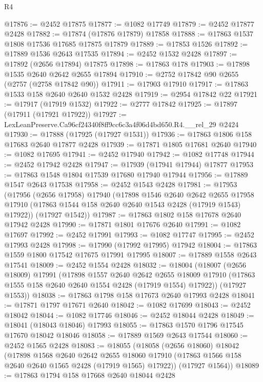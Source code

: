 \begin{lexlean}{R4}
\begin{coremodule}
@17876 := @2452 @17875
@17877 := @1082 @17749
@17879 := @2452 @17877 @2428
@17882 := @17874 (@17876 @17879) @17858
@17888 := @17863 @1537 @1808 @17536 @17685 @17875 @17879
@17889 := @17853 @1526
@17892 := @17889 @1536 @2643 @17535
@17894 := @2452 @1532 @2428
@17897 := @17892 (@2656 @17894) @17875
@17898 := @17863 @178
@17903 := @17898 @1535 @2640 @2642 @2655 @17894
@17910 := @2752 @17842 @90 @2655 (@2757 (@2758 @17842 @90))
@17911 := @17903 @17910
@17917 := @17863 @1533 @158 @2640 @2640 @1532 @2428
@17919 := @2954 @17842 @22
@17921 := @17917 (@17919 @1532)
@17922 := @2777 @17842
@17925 := @17897 (@17911 (@17921 @17922))
@17927 := LexLeanPreserve.Ca96cf24340f8ff9cc6c3a4f06d4bd650.R4.__rel_29 @2424
@17930 := @17888 (@17925 (@17927 @1531))
@17936 := @17863 @1806 @158 @17683 @2640 @17877 @2428
@17939 := @17871 @1805 @17681 @2640
@17940 := @1082 @17695
@17941 := @2452 @17940
@17942 := @1082 @17748
@17944 := @2452 @17942 @2428
@17947 := @17939 (@17941 @17944) @17877
@17953 := @17863 @1548 @1804 @17539 @17680 @17940 @17944
@17956 := @17889 @1547 @2643 @17538
@17958 := @2452 @1543 @2428
@17981 := @17953
    (@17956
      (@2656 @17958)
      @17940
      (@17898
        @1546
        @2640
        @2642
        @2655
        @17958
        @17910
        (@17863 @1544 @158 @2640 @2640 @1543 @2428 (@17919 @1543) @17922))
      (@17927 @1542))
@17987 := @17863 @1802 @158 @17678 @2640 @17942 @2428
@17990 := @17871 @1801 @17676 @2640
@17991 := @1082 @17697
@17992 := @2452 @17991
@17993 := @1082 @17747
@17995 := @2452 @17993 @2428
@17998 := @17990 (@17992 @17995) @17942
@18004 := @17863 @1559 @1800 @17542 @17675 @17991 @17995
@18007 := @17889 @1558 @2643 @17541
@18009 := @2452 @1554 @2428
@18032 := @18004
    (@18007
      (@2656 @18009)
      @17991
      (@17898
        @1557
        @2640
        @2642
        @2655
        @18009
        @17910
        (@17863 @1555 @158 @2640 @2640 @1554 @2428 (@17919 @1554) @17922))
      (@17927 @1553))
@18038 := @17863 @1798 @158 @17673 @2640 @17993 @2428
@18041 := @17871 @1797 @17671 @2640
@18042 := @1082 @17699
@18043 := @2452 @18042
@18044 := @1082 @17746
@18046 := @2452 @18044 @2428
@18049 := @18041 (@18043 @18046) @17993
@18055 := @17863 @1570 @1796 @17545 @17670 @18042 @18046
@18058 := @17889 @1569 @2643 @17544
@18060 := @2452 @1565 @2428
@18083 := @18055
    (@18058
      (@2656 @18060)
      @18042
      (@17898
        @1568
        @2640
        @2642
        @2655
        @18060
        @17910
        (@17863 @1566 @158 @2640 @2640 @1565 @2428 (@17919 @1565) @17922))
      (@17927 @1564))
@18089 := @17863 @1794 @158 @17668 @2640 @18044 @2428

\end{coremodule}
\end{lexlean}
